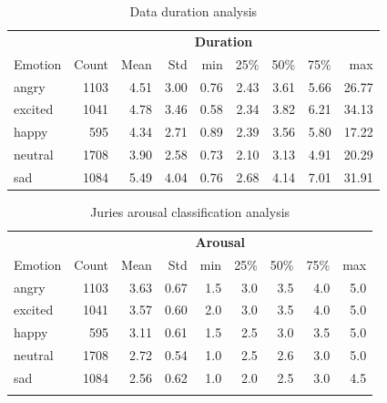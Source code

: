 \begin{table}[H]
\small
\caption{Data duration analysis}
\label{tab:duration}
\centering
    \begin{tabular}{lrrrrrrrr}
        \toprule
        {} & \multicolumn{8}{c}{\textbf{Duration}} \\ \cmidrule{2-9}
        Emotion &    Count &      Mean &       Std &     min &       25\% &      50\% &       75\% &      max \\
        \midrule
        angry   &   1103 &  4.51 & 3.00 &  0.76 &  2.43 &  3.61 &  5.66 &  26.77 \\
        \addlinespace
        excited &   1041 &  4.78 & 3.46 &  0.58 &  2.34 &  3.82 &  6.21 &  34.13 \\
        \addlinespace
        happy   &    595 &  4.34 & 2.71 &  0.89 &  2.39 &  3.56 &  5.80 &  17.22 \\
        \addlinespace
        neutral &   1708 &  3.90 & 2.58 &  0.73 &  2.10 &  3.13 &  4.91 &  20.29 \\
        \addlinespace
        sad     &   1084 &  5.49 & 4.04 &  0.76 &  2.68 &  4.14 &  7.01 &  31.91 \\
        \bottomrule
    \end{tabular}
\end{table}



\begin{table}[H]
\small
\caption{Juries arousal classification analysis}
\label{tab:activation}
\centering
    \begin{tabular}{lrrrrrrrr}
        \toprule
        {} & \multicolumn{8}{c}{\textbf{Arousal}} \\ \cmidrule{2-9}
        Emotion &    Count &      Mean &       Std &     min &       25\% &      50\% &       75\% &      max \\
        \midrule
        angry   &     1103 &  3.63 &  0.67 &  1.5 &  3.0 &  3.5 &  4.0 &  5.0\\         \addlinespace
        excited &     1041 &  3.57 &  0.60 &  2.0 &  3.0 &  3.5 &  4.0 &  5.0\\         \addlinespace
        happy   &      595 &  3.11 &  0.61 &  1.5 &  2.5 &  3.0 &  3.5 &  5.0\\         \addlinespace
        neutral &     1708 &  2.72 &  0.54 &  1.0 &  2.5 &  2.6 &  3.0 &  5.0\\         \addlinespace
        sad     &     1084 &  2.56 &  0.62 &  1.0 &  2.0 &  2.5 &  3.0 &  4.5\\         \addlinespace
        \bottomrule
    \end{tabular}
\end{table}


